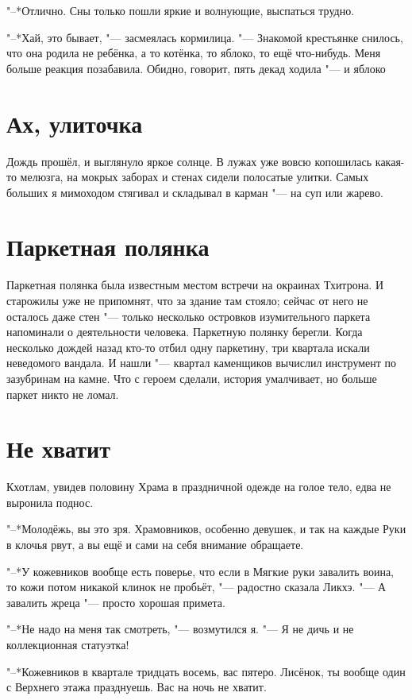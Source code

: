 "--*Отлично.
Сны только пошли яркие и волнующие, выспаться трудно.

"--*Хай, это бывает, "--- засмеялась кормилица.
"--- Знакомой крестьянке снилось, что она родила не ребёнка, а то котёнка, то яблоко, то ещё что-нибудь.
Меня больше реакция позабавила.
Обидно, говорит, пять декад ходила "--- и яблоко\ldotst

\section{Ах, улиточка}

Дождь прошёл, и выглянуло яркое солнце.
В лужах уже вовсю копошилась какая-то мелюзга, на мокрых заборах и стенах сидели полосатые улитки.
Самых больших я мимоходом стягивал и складывал в карман "--- на суп или жарево.

\section{Паркетная полянка}

Паркетная полянка была известным местом встречи на окраинах Тхитрона.
И старожилы уже не припомнят, что за здание там стояло;
сейчас от него не осталось даже стен "--- только несколько островков изумительного паркета напоминали о деятельности человека.
Паркетную полянку берегли.
Когда несколько дождей назад кто-то отбил одну паркетину, три квартала искали неведомого вандала.
И нашли "--- квартал каменщиков вычислил инструмент по зазубринам на камне.
Что с героем сделали, история умалчивает, но больше паркет никто не ломал.

\section{Не хватит}

Кхотлам, увидев половину Храма в праздничной одежде на голое тело, едва не выронила поднос.

"--*Молодёжь, вы это зря.
Храмовников, особенно девушек, и так на каждые Руки в клочья рвут, а вы ещё и сами на себя внимание обращаете.

"--*У кожевников вообще есть поверье, что если в Мягкие руки завалить воина, то кожи потом никакой клинок не пробьёт, "--- радостно сказала Ликхэ.
"--- А завалить жреца "--- просто хорошая примета.

"--*Не надо на меня так смотреть, "--- возмутился я.
"--- Я не дичь и не коллекционная статуэтка!

"--*Кожевников в квартале тридцать восемь, вас пятеро.
Лисёнок, ты вообще один с Верхнего этажа празднуешь.
Вас на ночь не хватит.

